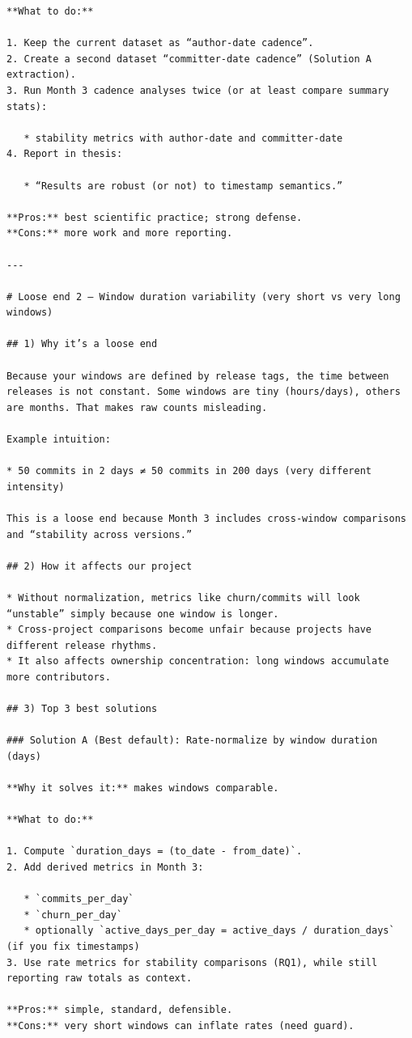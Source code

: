 \documentclass[11pt,a4paper]{article}
\begin{document}
\begin{verbatim}
**What to do:**

1. Keep the current dataset as “author-date cadence”.
2. Create a second dataset “committer-date cadence” (Solution A extraction).
3. Run Month 3 cadence analyses twice (or at least compare summary stats):

   * stability metrics with author-date and committer-date
4. Report in thesis:

   * “Results are robust (or not) to timestamp semantics.”

**Pros:** best scientific practice; strong defense.
**Cons:** more work and more reporting.

---

# Loose end 2 — Window duration variability (very short vs very long windows)

## 1) Why it’s a loose end

Because your windows are defined by release tags, the time between releases is not constant. Some windows are tiny (hours/days), others are months. That makes raw counts misleading.

Example intuition:

* 50 commits in 2 days ≠ 50 commits in 200 days (very different intensity)

This is a loose end because Month 3 includes cross-window comparisons and “stability across versions.”

## 2) How it affects our project

* Without normalization, metrics like churn/commits will look “unstable” simply because one window is longer.
* Cross-project comparisons become unfair because projects have different release rhythms.
* It also affects ownership concentration: long windows accumulate more contributors.

## 3) Top 3 best solutions

### Solution A (Best default): Rate-normalize by window duration (days)

**Why it solves it:** makes windows comparable.

**What to do:**

1. Compute `duration_days = (to_date - from_date)`.
2. Add derived metrics in Month 3:

   * `commits_per_day`
   * `churn_per_day`
   * optionally `active_days_per_day = active_days / duration_days` (if you fix timestamps)
3. Use rate metrics for stability comparisons (RQ1), while still reporting raw totals as context.

**Pros:** simple, standard, defensible.
**Cons:** very short windows can inflate rates (need guard).


\end{verbatim}
\end{document}
